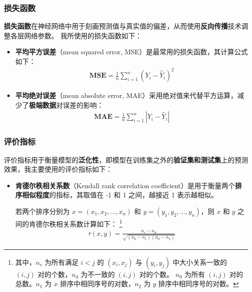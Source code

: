 \documentclass[notes=beamer]{ctexbeamer}
\begin{document}
\begin{frame}
  \frametitle{损失函数}
  \textbf{损失函数}在神经网络中用于刻画预测值与真实值的偏差，从而使用\textbf{反向传播}技术调整各层网络参数。
  我所使用的损失函数如下：
  \begin{itemize}
    \item   
    \textbf{平均平方误差}（mean squared error, MSE）是最常用的损失函数，其计算公式如下：
    \begin{align*}
      \mathbf{MSE} = \frac 1n \sum \limits_{i=1}^n (Y_i - \hat{Y}_i)^2
    \end{align*}
    \item
    \textbf{平均绝对误差}（mean absolute error, MAE）采用绝对值来代替平方运算，减少了\textbf{极端数据}对误差的影响：
    \begin{align*}
      \mathbf{MAE} = \frac 1n \sum \limits_{i=1}^n |Y_i - \hat{Y}_i|
    \end{align*}
  \end{itemize}
\end{frame}

\begin{frame}
  \frametitle{评价指标}
  评价指标用于衡量模型的\textbf{泛化性}，即模型在训练集之外的\textbf{验证集和测试集}上的预测效果，我主要使用的评价指标如下：
  \begin{itemize}
    \item 
    \textbf{肯德尔秩相关系数}（Kendall rank correlation coefficient）是用于衡量两个\textbf{排序}\textbf{相似程度}的指标，其取值在 -1 和 1 之间，越接近 1 表示越相似。

    若两个排序分别为 $x = (x_1,x_2, ..., x_n)$ 和 $y = (y_1,y_2, ..., y_n)$，则 $x$ 和 $y$ 之间的肯德尔秩相关系数计算如下：
    \footnote{其中，$n_c$ 为所有满足 $i < j$ 的 $(x_i, x_j)$ 与 $(y_i,y_j)$ 中大小关系一致的 $(i,j)$ 对的个数，$n_d$ 为不一致的 $(i,j)$ 对的个数。
    $n_0$ 为所有 $(i,j)$ 对的总数。$n_1$ 为 $x$ 排序中相同序号的对数，$n_2$ 为 $y$ 排序中相同序号的对数。}
    \begin{align*}
      \tau(x,y) = \frac{n_c-n_d}{\sqrt{(n_0-n_1)(n_0-n_2)}}
    \end{align*}
  \end{itemize}
\end{frame}
\end{document}
